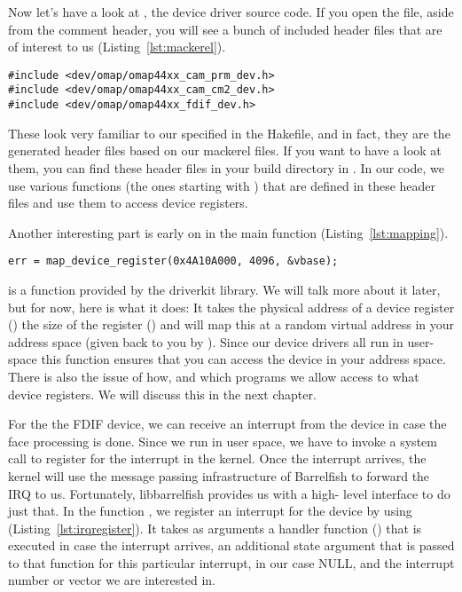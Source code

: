 \documentclass[a4paper,11pt,twoside]{report}
\begin{document}
Now let's have a look at , the
device driver source code. If you open the file, aside from the comment
header, you will see a bunch of included header files that are of interest to
us (Listing~\ref{lst:mackerel}).

\begin{lstlisting}[caption={Mackerel includes in driver source code.}, label={lst:mackerel}]
#include <dev/omap/omap44xx_cam_prm_dev.h>
#include <dev/omap/omap44xx_cam_cm2_dev.h>
#include <dev/omap/omap44xx_fdif_dev.h>
\end{lstlisting}

These look very familiar to our specified  in the
Hakefile, and in fact, they are the generated header files based on our
mackerel files. If you want to have a look at them, you can find these header
files in your build directory in . In our
code, we use various functions (the ones starting with )
that are defined in these header files and use them to access device
registers.

Another interesting part is early on in the main function (Listing~\ref{lst:mapping}).

\begin{lstlisting}[caption={Mapping device registers in virtual memory.}, label={lst:mapping}]
err = map_device_register(0x4A10A000, 4096, &vbase);
\end{lstlisting}

 is a function provided by the driverkit
library. We will talk more about it later, but for now, here is what it does:
It takes the physical address of a device register () the
size of the register () and will map this at a random virtual
address in your address space (given back to you by ). Since
our device drivers all run in user-space this function ensures that you can
access the device in your address space. There is also the issue of how, and
which programs we allow access to what device registers. We will discuss this
in the next chapter.

For the the FDIF device, we can receive an interrupt from the device in case
the face processing is done. Since we run in user space, we have to invoke a
system call to register for the interrupt in the kernel. Once the interrupt
arrives, the kernel will use the message passing infrastructure of Barrelfish
to forward the IRQ to us. Fortunately, libbarrelfish provides us with a high-
level interface to do just that. In the function ,
we register an interrupt for the device by using
 (Listing~\ref{lst:irqregister}). It takes as
arguments a handler function () that is executed in case
the interrupt arrives, an additional state argument that is passed to that
function for this particular interrupt, in our case NULL, and the interrupt
number or vector we are interested in.
\end{document}

